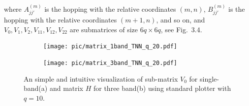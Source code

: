 where $A_{jj'}^{(m)}$ is the hopping with the relative coordinates $(m,n)$, $B_{jj'}^{(m)}$ is the hopping with the relative coordinates $(m+1,n)$, and so on,
and $V_{0},V_{1},V_{2},V_{11},V_{12},V_{22}$ are submatrices of size $6q \times 6q$, see Fig.~3.4.
\begin{figure}[htb]
	\centering
	\begin{subfigure}[b]{0.495\textwidth}
		\centering
		\texttt{[image: pic/matrix\_1band\_TNN\_q\_20.pdf]}
		\label{fig:3 band matrix}
	\end{subfigure}
	\begin{subfigure}[b]{0.495\textwidth}
		\centering
		\texttt{[image: pic/matrix\_3band\_TNN\_q\_20.pdf]}
		\label{fig:1 band matrix}
	\end{subfigure}
	\caption[A visualization of super matrix.]{
		An simple and intuitive visualization of sub-matrix $V_{0}$ for single-band(a) and matrix $H$ for three band(b) using standard plotter with $q = 10$.
	}
\end{figure}
